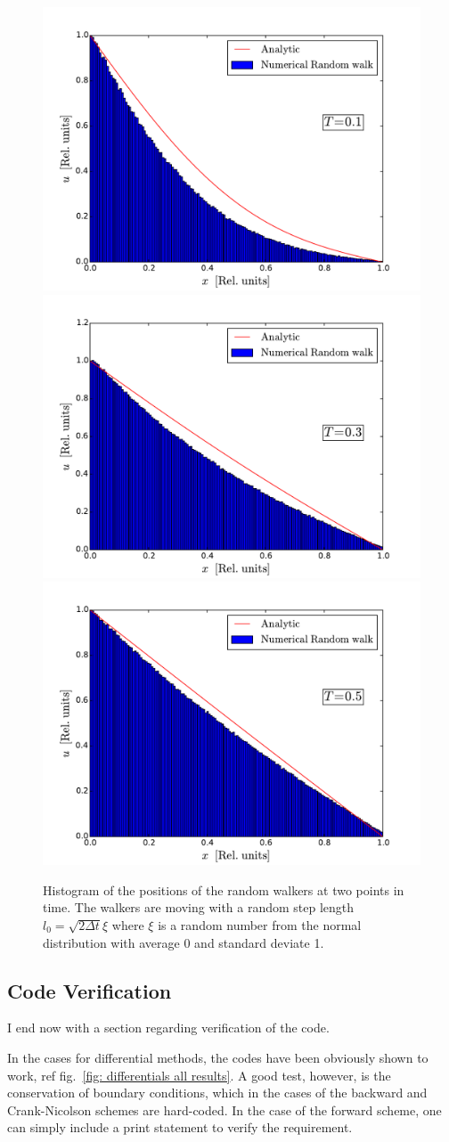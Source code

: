 \documentclass[twoside, 11pt]{article}
\begin{document}
		\begin{figure}
			\centering
			\includegraphics[width=0.5\linewidth]{Figures/RandomWalk_gaussian_step_T01}%
			\includegraphics[width=0.5\linewidth]{Figures/RandomWalk_gaussian_step_T03}
			\includegraphics[width=0.5\linewidth]{Figures/RandomWalk_gaussian_step_T05}
			\caption{Histogram of the positions of the random walkers at two points in time. The walkers are moving with a random step length $l_0 = \sqrt{2\Delta t}\xi$ where $\xi$ is a random number from the normal distribution with average 0 and standard deviate 1.}
			\label{fig: histogram random walkers gaussian step}
		\end{figure}
	\subsection{Code Verification}
		I end now with a section regarding verification of the code.
		
		In the cases for differential methods, the codes have been obviously shown to work, ref fig.~\ref{fig: differentials all results}. A good test, however, is the conservation of boundary conditions, which in the cases of the backward and Crank-Nicolson schemes are hard-coded. In the case of the forward scheme, one can simply include a print statement to verify the requirement.
		
\end{document}
